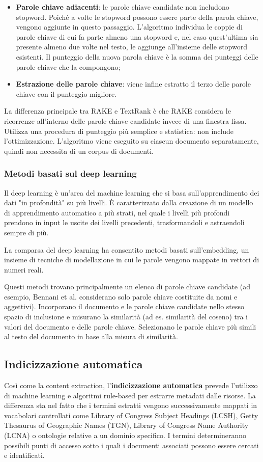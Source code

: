 \begin{itemize}
\item \textbf{Parole chiave adiacenti}: le parole chiave candidate non includono stopword. Poiché a volte le stopword possono essere parte della parola chiave, vengono aggiunte in questo passaggio. L'algoritmo individua le coppie di parole chiave di cui fa parte almeno una stopword e, nel caso quest'ultima sia presente almeno due volte nel testo, le aggiunge all'insieme delle stopword esistenti. Il punteggio della nuova parola chiave è la somma dei punteggi delle parole chiave che la compongono;
\item \textbf{Estrazione delle parole chiave}: viene infine estratto il terzo delle parole chiave con il punteggio migliore.
\end{itemize}

La differenza principale tra RAKE e TextRank è che RAKE considera le ricorrenze all'interno delle parole chiave candidate invece di una finestra fissa. Utilizza una procedura di punteggio più semplice e statistica: non include l'ottimizzazione. L'algoritmo viene eseguito su ciascun documento separatamente, quindi non necessita di un corpus di documenti.

\subsubsection{Metodi basati sul deep learning}
Il deep learning è un'area del machine learning che si basa sull'apprendimento dei dati "in profondità" su più livelli. È caratterizzato dalla creazione di un modello di apprendimento automatico a più strati, nel quale i livelli più profondi prendono in input le uscite dei livelli precedenti, trasformandoli e astraendoli sempre di più.

La comparsa del deep learning ha consentito metodi basati sull'embedding, un insieme di tecniche di modellazione in cui le parole vengono mappate in vettori di numeri reali. 

Questi metodi trovano principalmente un elenco di parole chiave candidate (ad esempio, Bennani et al. considerano solo parole chiave costituite da nomi e aggettivi). Incorporano il documento e le parole chiave candidate nello stesso spazio di inclusione e misurano la similarità (ad es. similarità del coseno) tra i valori del documento e delle parole chiave. Selezionano le parole chiave più simili al testo del documento in base alla misura di similarità.

\subsection{Indicizzazione automatica}
Così come la content extraction, l'\textbf{indicizzazione automatica} prevede l'utilizzo di machine learning e algoritmi rule-based per estrarre metadati dalle risorse. La differenza sta nel fatto che i termini estratti vengono successivamente mappati in vocabolari controllati come Library of Congress Subject Headings (LCSH), Getty Thesaurus of Geographic Names (TGN), Library of Congress Name Authority (LCNA) o ontologie relative a un dominio specifico. I termini determineranno possibili punti di accesso sotto i quali i documenti associati possono essere cercati e identificati.

